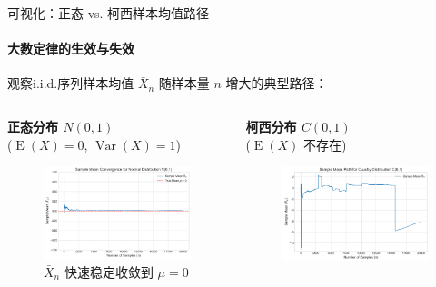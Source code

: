 \documentclass[UTF8]{beamer}
\DeclareMathOperator{\E}{\operatorname{E}}
\DeclareMathOperator{\Var}{\operatorname{Var}}
\begin{document}
\begin{frame}[shrink=10]{可视化：正态 vs. 柯西样本均值路径}
    \framesubtitle{大数定律的生效与失效}
    观察i.i.d.序列样本均值 $\bar{X}_n$ 随样本量 $n$ 增大的典型路径：
    \begin{columns}[T]
        \begin{column}{0.5\textwidth}
            \textbf{正态分布 $N(0,1)$}\\($\E(X)=0$, $\Var(X)=1$)
            \begin{figure}
                \includegraphics[width=\linewidth]{normal_mean_convergence.png} %
                \caption{$\bar{X}_n$ 快速稳定收敛到 $\mu=0$}
            \end{figure}
        \end{column}
        \begin{column}{0.5\textwidth}
            \textbf{柯西分布 $C(0,1)$}\\($\E(X)$ 不存在)
            \begin{figure}
                \includegraphics[width=\linewidth]{cauchy_mean_no_convergence.png} %

\end{figure}
\end{column}
\end{columns}
\end{frame}
\end{document}
